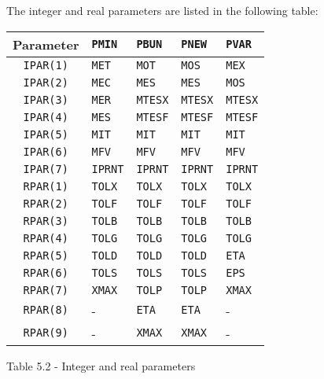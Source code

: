 \documentclass{article}
\begin{document}
The integer and real parameters are listed in the following table:

\vspace{2mm}

\begin{center}
\begin{tabular}{c|llll} \hline
Parameter & {\tt PMIN} & {\tt PBUN} & {\tt PNEW} & {\tt PVAR} \\ \hline
{\tt IPAR(1)} &   {\tt MET} &   {\tt MOT} &   {\tt MOS} &   {\tt MEX} \\
{\tt IPAR(2)} &   {\tt MEC} &   {\tt MES} &   {\tt MES} &   {\tt MOS} \\
{\tt IPAR(3)} &   {\tt MER} & {\tt MTESX} & {\tt MTESX} & {\tt MTESX} \\
{\tt IPAR(4)} &   {\tt MES} & {\tt MTESF} & {\tt MTESF} & {\tt MTESF} \\
{\tt IPAR(5)} &   {\tt MIT} &   {\tt MIT} &   {\tt MIT} &   {\tt MIT} \\
{\tt IPAR(6)} &   {\tt MFV} &   {\tt MFV} &   {\tt MFV} &   {\tt MFV} \\
{\tt IPAR(7)} & {\tt IPRNT} & {\tt IPRNT} & {\tt IPRNT} & {\tt IPRNT} \\ \hline
{\tt RPAR(1)} &  {\tt TOLX} &  {\tt TOLX} &  {\tt TOLX} &  {\tt TOLX} \\
{\tt RPAR(2)} &  {\tt TOLF} &  {\tt TOLF} &  {\tt TOLF} &  {\tt TOLF} \\
{\tt RPAR(3)} &  {\tt TOLB} &  {\tt TOLB} &  {\tt TOLB} &  {\tt TOLB} \\
{\tt RPAR(4)} &  {\tt TOLG} &  {\tt TOLG} &  {\tt TOLG} &  {\tt TOLG} \\
{\tt RPAR(5)} &  {\tt TOLD} &  {\tt TOLD} &  {\tt TOLD} &   {\tt ETA} \\
{\tt RPAR(6)} &  {\tt TOLS} &  {\tt TOLS} &  {\tt TOLS} &   {\tt EPS} \\
{\tt RPAR(7)} &  {\tt XMAX} &  {\tt TOLP }&  {\tt TOLP} &  {\tt XMAX} \\
{\tt RPAR(8)} &          -  &   {\tt ETA} &   {\tt ETA} &          -  \\
{\tt RPAR(9)} &          -  &  {\tt XMAX} &  {\tt XMAX} &          -  \\ \hline
\end{tabular}

\vspace{4mm}

Table 5.2 - Integer and real parameters
\end{center}

\vspace{2mm}
\end{document}
